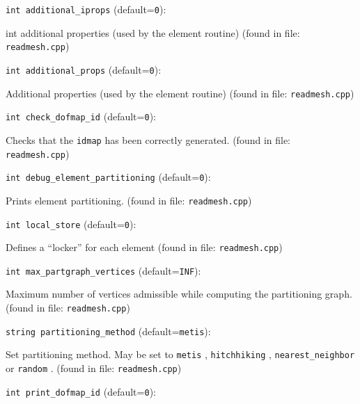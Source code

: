 \item\verb+int additional_iprops+ {\rm(default=\verb|0|)}:

int additional properties (used by the element routine)
 (found in file: \verb+readmesh.cpp+)
\item\verb+int additional_props+ {\rm(default=\verb|0|)}:

Additional properties (used by the element routine)
 (found in file: \verb+readmesh.cpp+)
\item\verb+int check_dofmap_id+ {\rm(default=\verb|0|)}:

Checks that the  \verb+idmap+  has been correctly generated. 
 (found in file: \verb+readmesh.cpp+)
\item\verb+int debug_element_partitioning+ {\rm(default=\verb|0|)}:

Prints element partitioning. 
 (found in file: \verb+readmesh.cpp+)
\item\verb+int local_store+ {\rm(default=\verb|0|)}:

Defines a ``locker'' for each element
 (found in file: \verb+readmesh.cpp+)
\item\verb+int max_partgraph_vertices+ {\rm(default=\verb|INF|)}:

Maximum number of vertices admissible while computing the
partitioning graph.
 (found in file: \verb+readmesh.cpp+)
\item\verb+string partitioning_method+ {\rm(default=\verb|metis|)}:

Set partitioning method. May be set to  \verb+metis+ ,
 \verb+hitchhiking+ ,  \verb+nearest_neighbor+  or  \verb+random+ .
 (found in file: \verb+readmesh.cpp+)
\item\verb+int print_dofmap_id+ {\rm(default=\verb|0|)}:

